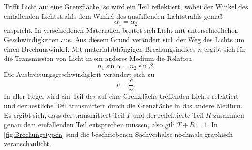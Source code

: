 Trifft Licht auf eine Grenzfläche, so wird ein Teil reflektiert, wobei der Winkel des einfallenden Lichtstrahls dem Winkel
des ausfallenden Lichtstrahls gemäß
\begin{equation}
    \alpha_1 = \alpha_2 \label{eq:Reflexion}
\end{equation}
enspricht.
In verschiedenen Materialien breitet sich Licht mit unterschiedlichen Geschwindigkeiten aus. Aus diesem Grund verändert sich
der Weg des Lichts um einen Brechunswinkel. Mit materialabhängigen Brechungsindices $n$ ergibt sich für die Transmission
von Licht in ein anderes Medium die Relation
\begin{equation}
    n_1\sin\alpha = n_2\sin\beta. \label{eq:Brechung}
\end{equation}
Die Ausbreitungsgeschwindigkeit verändert sich zu
\begin{equation}
    v = \frac{c}{n}. \label{eq:Ausbreitungsgeschwindigkeit}
\end{equation}
In aller Regel wird ein Teil des auf eine Grenzfläche treffenden Lichts relektiert und der restliche Teil transmittert durch die 
Grenzfläche in das andere Medium. Es ergibt sich, dass der transmittert Teil $T$ und der reflektierte Teil $R$ zusammen genau
dem einfallenden Teil entsprechen müssen, also gilt $T + R = 1$.
In \autoref{fig:Brechungstypen} sind die beschriebenen Sachverhalte nochmals graphisch veranschaulicht.
